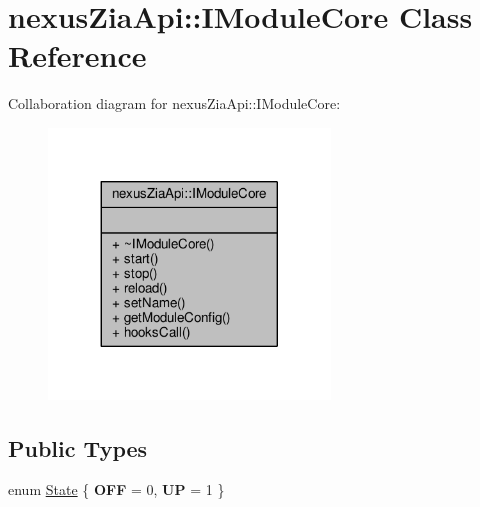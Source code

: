 \hypertarget{classnexusZiaApi_1_1IModuleCore}{}\section{nexus\+Zia\+Api\+:\+:I\+Module\+Core Class Reference}
\label{classnexusZiaApi_1_1IModuleCore}


Collaboration diagram for nexus\+Zia\+Api\+:\+:I\+Module\+Core\+:\nopagebreak
\begin{figure}[H]
\begin{center}
\leavevmode
\includegraphics[width=212pt]{classnexusZiaApi_1_1IModuleCore__coll__graph}
\end{center}
\end{figure}
\subsection*{Public Types}
\begin{DoxyCompactItemize}
\item 
enum \hyperlink{classnexusZiaApi_1_1IModuleCore_abc0dcb61041187581a512822e934bc25}{State} \{ {\bfseries O\+FF} = 0, 
{\bfseries UP} = 1
 \}
\end{DoxyCompactItemize}
